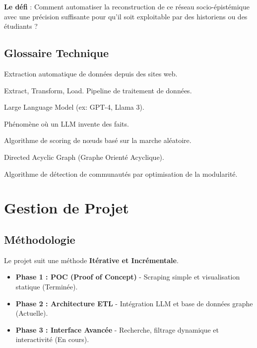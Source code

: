 \documentclass[12pt,a4paper]{report}
\begin{document}
\textbf{Le défi} : Comment automatiser la reconstruction de ce réseau socio-épistémique avec une précision suffisante pour qu'il soit exploitable par des historiens ou des étudiants ?

\section{Glossaire Technique}
\begin{description}[style=nextline, leftmargin=3cm]
    \item[Scraping] Extraction automatique de données depuis des sites web.
    \item[ETL] Extract, Transform, Load. Pipeline de traitement de données.
    \item[LLM] Large Language Model (ex: GPT-4, Llama 3).
    \item[Hallucination] Phénomène où un LLM invente des faits.
    \item[PageRank] Algorithme de scoring de nœuds basé sur la marche aléatoire.
    \item[DAG] Directed Acyclic Graph (Graphe Orienté Acyclique).
    \item[Louvain] Algorithme de détection de communautés par optimisation de la modularité.
\end{description}

\chapter{Gestion de Projet}

\section{Méthodologie}
Le projet suit une méthode \textbf{Itérative et Incrémentale}.
\begin{itemize}
    \item \textbf{Phase 1 : POC (Proof of Concept)} - Scraping simple et visualisation statique (Terminée).
    \item \textbf{Phase 2 : Architecture ETL} - Intégration LLM et base de données graphe (Actuelle).
    \item \textbf{Phase 3 : Interface Avancée} - Recherche, filtrage dynamique et interactivité (En cours).
\end{itemize}
\end{document}
